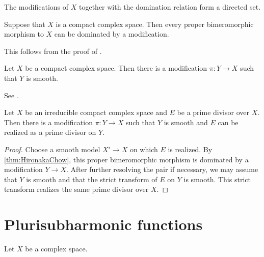 The modifications of $X$ together with the domination relation form a directed set.




\begin{theorem}\label{thm:HironakaChow}
    Suppose that $X$ is a compact complex space. Then every proper bimeromorphic morphism to $X$ can be dominated by a modification.
\end{theorem}
This follows from the proof of \cite[Corollary~2]{Hir75}.

\begin{theorem}\label{thm:res}
    Let $X$ be a compact complex space. Then there is a modification $\pi\colon Y\rightarrow X$ such that $Y$ is smooth.
\end{theorem}
See \cite{BM97, Wlo09}.

\begin{corollary}\label{cor:primerealization}
    Let $X$ be an irreducible compact complex space and $E$ be a prime divisor over $X$. Then there is a modification $\pi\colon Y\rightarrow X$ such that $Y$ is smooth and $E$ can be realized as a prime divisor on $Y$.
\end{corollary}
\begin{proof}
    Choose a smooth model $X'\rightarrow X$ on which $E$ is realized. By \cref{thm:HironakaChow}, this proper bimeromorphic morphism is dominated by a modification $Y\rightarrow X$. After further resolving the pair if necessary, we may assume that $Y$ is smooth and that the strict transform of $E$ on $Y$ is smooth. This strict transform realizes the same prime divisor over $X$.
\end{proof}

\section{Plurisubharmonic functions}
\label{sec:unib_psh}
Let $X$ be a complex space.

